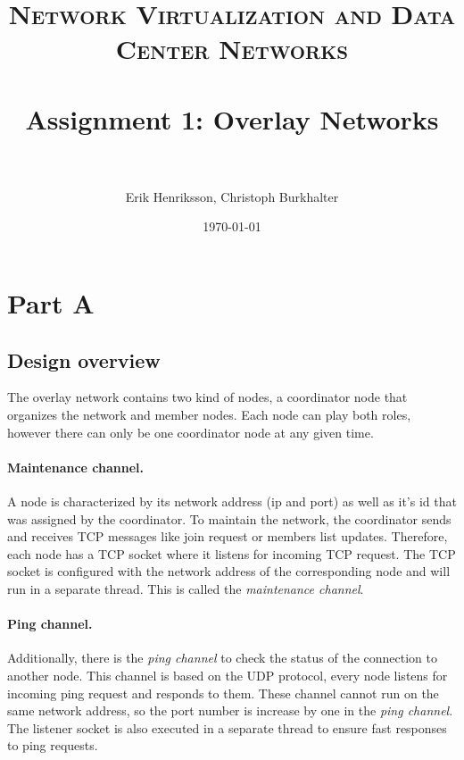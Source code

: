 \documentclass[paper=a4, fontsize=11pt]{scrartcl} %
\title{	
\normalfont \normalsize 
\textsc{Network Virtualization and Data Center Networks} \\ [25pt] %
\horrule{0.5pt} \\[0.4cm] %
\huge Assignment 1: Overlay Networks \\ %
\horrule{2pt} \\[0.5cm] %
}
\author{Erik Henriksson, Christoph Burkhalter} %
\date{\normalsize\today} %
\numberwithin{equation}{section} %
\numberwithin{figure}{section} %
\numberwithin{table}{section} %
\begin{document}
\maketitle %


\section{Part A}


\subsection{Design overview}

The overlay network contains two kind of nodes, a coordinator node that organizes the network and member nodes. Each node can play both roles, however there can only be one coordinator node at any given time.

\paragraph{Maintenance channel.}

A node is characterized by its network address (ip and port) as well as it's id that was assigned by the coordinator. To maintain the network, the coordinator sends and receives TCP messages like join request or members list updates. Therefore, each node has a TCP socket where it listens for incoming TCP request. The TCP socket is configured with the network address of the corresponding node and will run in a separate thread. This is called the \textit{maintenance channel}. 

\paragraph{Ping channel.}

Additionally, there is the \textit{ping channel} to check the status of the connection to another node. This channel is based on the UDP protocol, every node listens for incoming ping request and responds to them. These channel cannot run on the same network address, so the port number is increase by one in the \textit{ping channel}. The listener socket is also executed in a separate thread to ensure fast responses to ping requests.
\end{document}
